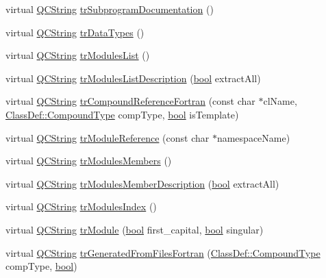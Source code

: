 \begin{DoxyCompactItemize}
\item 
virtual \hyperlink{class_q_c_string}{Q\+C\+String} \hyperlink{class_translator_croatian_ab4fa9162851c02e3b7332bd6e6ce75b7}{tr\+Subprogram\+Documentation} ()
\item 
virtual \hyperlink{class_q_c_string}{Q\+C\+String} \hyperlink{class_translator_croatian_ae56de72f5f2b9fca50e762a1c09006c9}{tr\+Data\+Types} ()
\item 
virtual \hyperlink{class_q_c_string}{Q\+C\+String} \hyperlink{class_translator_croatian_aa2eb500fb2597d7b76330e30ee455e74}{tr\+Modules\+List} ()
\item 
virtual \hyperlink{class_q_c_string}{Q\+C\+String} \hyperlink{class_translator_croatian_a64ef6563dc8cdbb23826799c396542b8}{tr\+Modules\+List\+Description} (\hyperlink{qglobal_8h_a1062901a7428fdd9c7f180f5e01ea056}{bool} extract\+All)
\item 
virtual \hyperlink{class_q_c_string}{Q\+C\+String} \hyperlink{class_translator_croatian_a1bd0a40809c2703b5889e85efb06751a}{tr\+Compound\+Reference\+Fortran} (const char $\ast$cl\+Name, \hyperlink{class_class_def_ae70cf86d35fe954a94c566fbcfc87939}{Class\+Def\+::\+Compound\+Type} comp\+Type, \hyperlink{qglobal_8h_a1062901a7428fdd9c7f180f5e01ea056}{bool} is\+Template)
\item 
virtual \hyperlink{class_q_c_string}{Q\+C\+String} \hyperlink{class_translator_croatian_abb14abc827157cd52d6e34777608c329}{tr\+Module\+Reference} (const char $\ast$namespace\+Name)
\item 
virtual \hyperlink{class_q_c_string}{Q\+C\+String} \hyperlink{class_translator_croatian_affc180feb6c2ba141af784532b38dad7}{tr\+Modules\+Members} ()
\item 
virtual \hyperlink{class_q_c_string}{Q\+C\+String} \hyperlink{class_translator_croatian_a6b48597f47640e0cadd1a6c4f551cc49}{tr\+Modules\+Member\+Description} (\hyperlink{qglobal_8h_a1062901a7428fdd9c7f180f5e01ea056}{bool} extract\+All)
\item 
virtual \hyperlink{class_q_c_string}{Q\+C\+String} \hyperlink{class_translator_croatian_a9964e73c7bb1aceae539df16ca9de1e5}{tr\+Modules\+Index} ()
\item 
virtual \hyperlink{class_q_c_string}{Q\+C\+String} \hyperlink{class_translator_croatian_ad68309492bd413275f9056ff5f2ef5aa}{tr\+Module} (\hyperlink{qglobal_8h_a1062901a7428fdd9c7f180f5e01ea056}{bool} first\+\_\+capital, \hyperlink{qglobal_8h_a1062901a7428fdd9c7f180f5e01ea056}{bool} singular)
\item 
virtual \hyperlink{class_q_c_string}{Q\+C\+String} \hyperlink{class_translator_croatian_afd13c496f152991572102637abdd0a66}{tr\+Generated\+From\+Files\+Fortran} (\hyperlink{class_class_def_ae70cf86d35fe954a94c566fbcfc87939}{Class\+Def\+::\+Compound\+Type} comp\+Type, \hyperlink{qglobal_8h_a1062901a7428fdd9c7f180f5e01ea056}{bool})

\end{DoxyCompactItemize}
